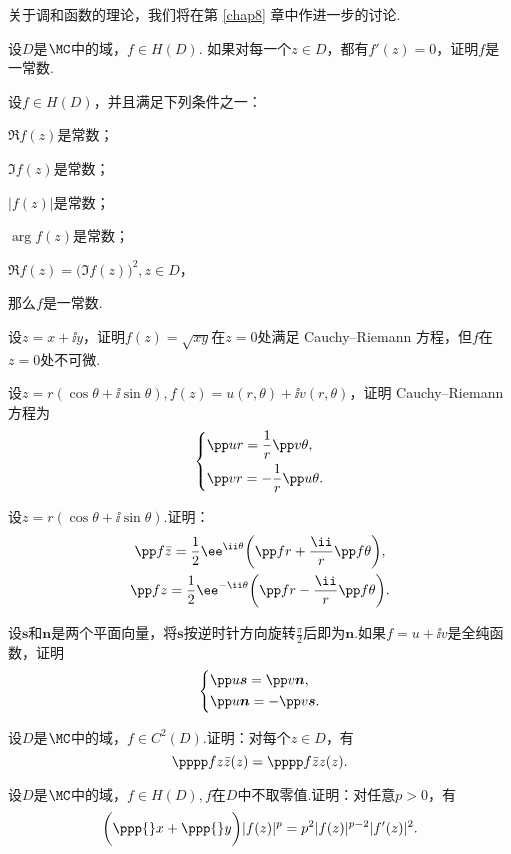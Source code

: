 关于调和函数的理论，我们将在第 \ref{chap8} 章中作进一步的讨论.
\begin{xiti}\hypertarget{xiti2.2}{}
\item \hypertarget{xiti2.2.1}{}设$D$是$\MC$中的域，$f\in H(D)$. 如果对每一个$z\in D$，都有$f'(z)=0$，证明$f$是一常数.
\item 设$f\in H(D)$，并且满足下列条件之一：
\begin{enuma}
  \item $\Re f(z)$是常数；
  \item $\Im f(z)$是常数；
  \item $|f(z)|$是常数；
  \item $\arg f(z)$是常数；
  \item $\Re f(z)=\big(\Im f(z)\big)^2,z\in D$，
\end{enuma}
那么$f$是一常数.
\item 设$z=x+\ii y$，证明$f(z)=\sqrt{xy}$在$z=0$处满足 Cauchy--Riemann 方程，但$f$在$z=0$处不可微.
\item \hypertarget{xiti2.2.4}{}设$z=r(\cos\theta+\ii\sin\theta),f(z)=u(r,\theta)+\ii v(r,\theta)$，证明 Cauchy--Riemann 方程为
    \[\left\{\begin{aligned}
      &\pp ur=\frac1r\pp v{\theta},\\
      &\pp vr=-\frac1r\pp u{\theta}.
    \end{aligned}\right.\]
\item 设$z=r(\cos\theta+\ii\sin\theta)$.证明：
\begin{gather*}
  \pp f{\bar z}=\frac12\ee^{\ii\theta}\bigg(\pp fr+\frac{\ii}r\pp f{\theta}\bigg),\\
  \pp fz=\frac12\ee^{-\ii\theta}\bigg(\pp fr-\frac{\ii}r\pp f{\theta}\bigg).
\end{gather*}
\item 设$\boldsymbol s$和$\boldsymbol n$是两个平面向量，将$\boldsymbol s$按逆时针方向旋转$\frac\pi2$后即为$\boldsymbol n$.如果$f=u+\ii v$是全纯函数，证明
  \[\left\{\begin{aligned}
  &\pp u{\boldsymbol s}=\pp v{\boldsymbol n},\\
  &\pp u{\boldsymbol n}=-\pp v{\boldsymbol s}.
  \end{aligned}\right.\]
\item 设$D$是$\MC$中的域，$f\in C^2(D)$.证明：对每个$z\in D$，有
\[\pppp fz{\bar z}(z)=\pppp f{\bar z}z(z).\]
\item 设$D$是$\MC$中的域，$f\in H(D),f$在$D$中不取零值.证明：对任意$p>0$，有
\[\bigg(\ppp{}x+\ppp{}y\bigg)|f(z)|^p=p^2|f(z)|^{p-2}|f'(z)|^2.\]

\end{xiti}
